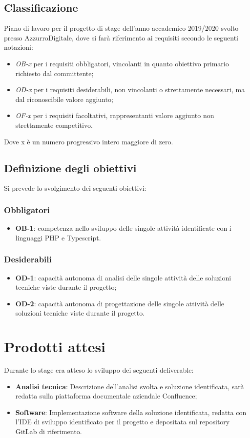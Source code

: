 \subsection{Classificazione}
Piano di lavoro per il progetto di stage dell'anno accademico 2019/2020 svolto presso AzzurroDigitale, dove si farà riferimento ai requisiti secondo le seguenti notazioni:
\begin{itemize}
	\item \textit{OB-x} per i requisiti obbligatori, vincolanti in quanto obiettivo primario richiesto dal committente;
	\item \textit{OD-x} per i requisiti desiderabili, non vincolanti o strettamente necessari,
	ma dal riconoscibile valore aggiunto;
	\item \textit{OF-x} per i requisiti facoltativi, rappresentanti valore aggiunto non strettamente competitivo.
\end{itemize}
Dove x è un numero progressivo intero maggiore di zero.

\subsection{Definizione degli obiettivi}
Si prevede lo svolgimento dei seguenti obiettivi:
\subsubsection*{Obbligatori}
\begin{itemize}
 \item \textbf{OB-1}: competenza nello sviluppo delle singole attività identificate con i linguaggi PHP e Typescript.
\end{itemize}
\subsubsection*{Desiderabili} 
\begin{itemize}
 \item \textbf{OD-1}: capacità autonoma di analisi delle singole attività delle soluzioni tecniche viste durante il progetto;
\item \textbf{OD-2}: capacità autonoma di progettazione delle singole attività delle soluzioni tecniche viste durante il progetto.
\end{itemize}

\section{Prodotti attesi}
Durante lo stage era atteso lo sviluppo dei seguenti deliverable:
\begin{itemize}
	\item \textbf{Analisi tecnica}: Descrizione dell’analisi svolta e soluzione identificata, sarà redatta sulla piattaforma documentale aziendale Confluence;
	\item \textbf{Software}: Implementazione software della soluzione identificata, redatta con l’IDE di sviluppo identificato per il progetto e depositata sul repository GitLab di riferimento.
\end{itemize}

